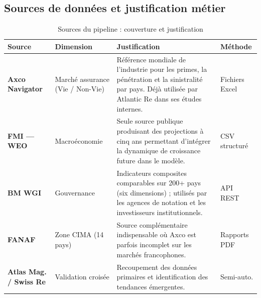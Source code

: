 \documentclass[12pt,a4paper]{report}
\begin{document}
\begin{figure}[H]
{%
}
\end{figure}

\subsection{Sources de données et justification métier}

\begin{table}[H]
\centering
\caption{Sources du pipeline : couverture et justification}
\label{tab:sources_pipeline}
\small
\begin{tabularx}{\textwidth}{@{}p{2.5cm}p{2.5cm}Xp{2.5cm}@{}}
\toprule
\textbf{Source} & \textbf{Dimension} & \textbf{Justification} & \textbf{Méthode} \\
\midrule
\textbf{Axco Navigator} & Marché assurance (Vie / Non-Vie) & Référence mondiale de l'industrie pour les primes, la pénétration et la sinistralité par pays. Déjà utilisée par Atlantic Re dans ses études internes. & Fichiers Excel \\
\midrule
\textbf{FMI --- WEO} & Macroéconomie & Seule source publique produisant des projections à cinq ans permettant d'intégrer la dynamique de croissance future dans le modèle. & CSV structuré \\
\midrule
\textbf{BM WGI} & Gouvernance & Indicateurs composites comparables sur 200+ pays (six dimensions) ; utilisés par les agences de notation et les investisseurs institutionnels. & API REST \\
\midrule
\textbf{FANAF} & Zone CIMA (14 pays) & Source complémentaire indispensable où Axco est parfois incomplet sur les marchés francophones. & Rapports PDF \\
\midrule
\textbf{Atlas Mag. / Swiss Re} \citep{AtlasMagazine2023, SwissRe2023} & Validation croisée & Recoupement des données primaires et identification des tendances émergentes. & Semi-auto. \\
\bottomrule
\end{tabularx}
\end{table}
\end{document}
